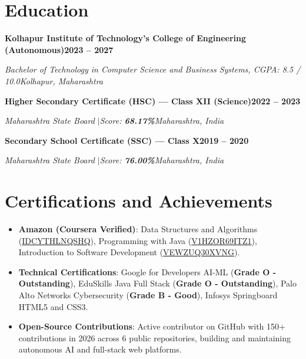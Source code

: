 \documentclass[letterpaper,10pt]{article}
\newcommand{\resumeItemListStart}{\begin{itemize}[leftmargin=0.18in, topsep=1.5pt, itemsep=2.0pt, parsep=0pt]}
\newcommand{\resumeItemListEnd}{\end{itemize}\vspace{3pt}}
\newcommand{\resumeHeading}[2]{%
  \noindent\textbf{#1}\hfill\textbf{#2}\par
}
\newcommand{\resumeSubHeading}[2]{%
  \noindent\textit{#1}\hfill\textit{#2}\par
}
\newcommand{\sep}{\hspace{3pt}$|$\hspace{3pt}}
\begin{document}
\section{Education}

\resumeHeading{Kolhapur Institute of Technology's College of Engineering (Autonomous)}{2023 -- 2027}
\resumeSubHeading{Bachelor of Technology in Computer Science and Business Systems, CGPA: 8.5 / 10.0}{Kolhapur, Maharashtra}

\vspace{3pt}
\resumeHeading{Higher Secondary Certificate (HSC) --- Class XII (Science)}{2022 -- 2023}
\resumeSubHeading{Maharashtra State Board \sep Score: \textbf{68.17\%}}{Maharashtra, India}

\vspace{3pt}
\resumeHeading{Secondary School Certificate (SSC) --- Class X}{2019 -- 2020}
\resumeSubHeading{Maharashtra State Board \sep Score: \textbf{76.00\%}}{Maharashtra, India}

\section{Certifications and Achievements}
\resumeItemListStart
  \item \textbf{Amazon (Coursera Verified)}: Data Structures and Algorithms (\href{https://coursera.org/verify/IDCYTHLNQSHQ}{IDCYTHLNQSHQ}), Programming with Java (\href{https://coursera.org/verify/V1HZOR69ITZ1}{V1HZOR69ITZ1}), Introduction to Software Development (\href{https://coursera.org/verify/VEWZUQ30XVNG}{VEWZUQ30XVNG}).
  \item \textbf{Technical Certifications}: Google for Developers AI-ML (\textbf{Grade O - Outstanding}), EduSkills Java Full Stack (\textbf{Grade O - Outstanding}), Palo Alto Networks Cybersecurity (\textbf{Grade B - Good}), Infosys Springboard HTML5 and CSS3.
  \item \textbf{Open-Source Contributions}: \faGithub\hspace{2pt}Active contributor on GitHub with 150+ contributions in 2026 across 6 public repositories, building and maintaining autonomous AI and full-stack web platforms.
\resumeItemListEnd
\end{document}
